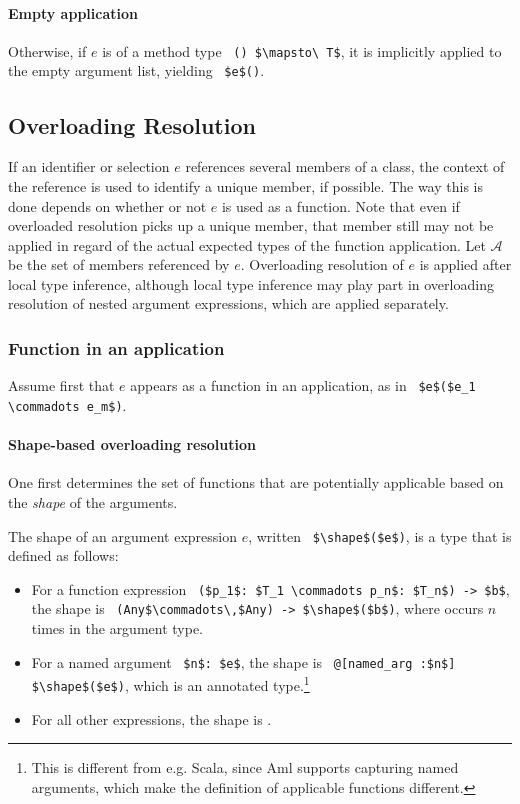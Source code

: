 \paragraph{Empty application}
Otherwise, if $e$ is of a method type ~\lstinline!() $\mapsto\ T$!, it is implicitly applied to the empty argument list, yielding ~\lstinline!$e$()!. 






\subsection{Overloading Resolution}
\label{sec:overloading-resolution}

If an identifier or selection $e$ references several members of a class, the context of the reference is used to identify a unique member, if possible. The way this is done depends on whether or not $e$ is used as a function. Note that even if overloaded resolution picks up a unique member, that member still may not be applied in regard of the actual expected types of the function application. Let $\mathcal{A}$ be the set of members referenced by $e$. Overloading resolution of $e$ is applied after local type inference, although local type inference may play part in overloading resolution of nested argument expressions, which are applied separately. 

\subsubsection{Function in an application}

Assume first that $e$ appears as a function in an application, as in ~\lstinline!$e$($e_1 \commadots e_m$)!.

\paragraph{Shape-based overloading resolution}
One first determines the set of functions that are potentially applicable based on the {\em shape} of the arguments. 

The shape of an argument expression $e$, written ~\lstinline!$\shape$($e$)!, is a type that is defined as follows:
\begin{itemize}
\item For a function expression ~\lstinline!($p_1$: $T_1 \commadots p_n$: $T_n$) -> $b$!, the shape is ~\lstinline!(Any$\commadots\,$Any) -> $\shape$($b$)!, where  occurs $n$ times in the argument type. 
\item For a named argument ~\lstinline!$n$: $e$!, the shape is ~\lstinline!@[named_arg :$n$] $\shape$($e$)!, which is an annotated type.\footnote{This is different from e.g. Scala, since Aml supports capturing named arguments, which make the definition of applicable functions different.} %
\item For all other expressions, the shape is . 
\end{itemize}

